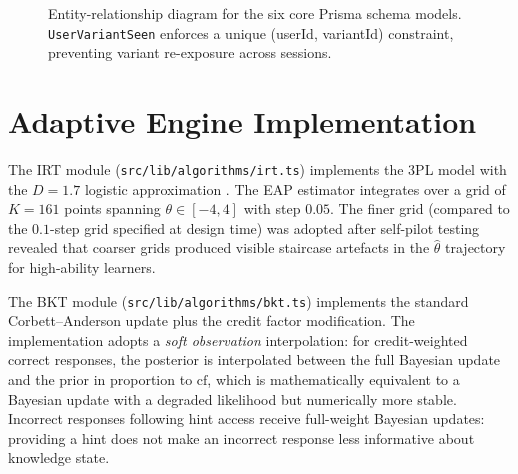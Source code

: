\begin{figure}[H]
\caption[ER diagram: six core Prisma schema models.]{Entity-relationship diagram for the six core Prisma schema models.
\texttt{UserVariantSeen} enforces a unique (userId, variantId) constraint,
preventing variant re-exposure across sessions.}
\label{fig:er_diagram}
\end{figure}

\section{Adaptive Engine Implementation}
\label{sec:impl_engine}

The IRT module (\texttt{src/lib/algorithms/irt.ts}) implements the 3PL model
with the $D = 1.7$ logistic approximation \parencite{lord1980}. The EAP
estimator integrates over a grid of $K = 161$ points spanning $\theta \in
[-4, 4]$ with step $0.05$. The finer grid (compared to the $0.1$-step grid
specified at design time) was adopted after self-pilot testing revealed that
coarser grids produced visible staircase artefacts in the $\hat{\theta}$
trajectory for high-ability learners.

The BKT module (\texttt{src/lib/algorithms/bkt.ts}) implements the standard
Corbett--Anderson update plus the credit factor modification. The implementation
adopts a \textit{soft observation} interpolation: for credit-weighted correct
responses, the posterior is interpolated between the full Bayesian update and
the prior in proportion to $\text{cf}$, which is mathematically equivalent to
a Bayesian update with a degraded likelihood but numerically more stable.
Incorrect responses following hint access receive full-weight Bayesian updates:
providing a hint does not make an incorrect response less informative about
knowledge state.

